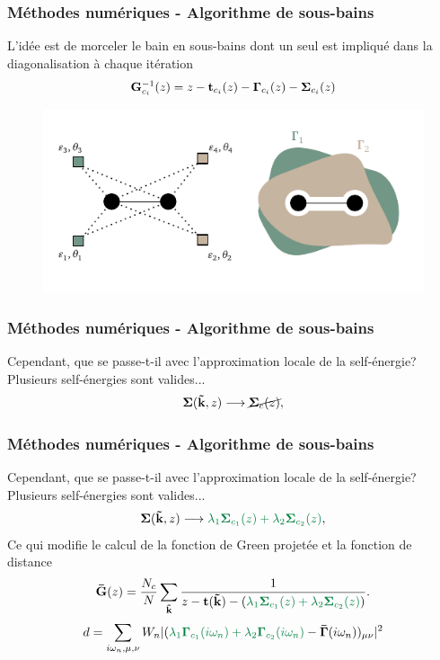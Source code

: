 \begin{frame}
    \frametitle{Méthodes numériques - Algorithme de sous-bains}
    L'idée est de morceler le bain en sous-bains dont un seul est impliqué dans
    la diagonalisation à chaque itération
    \begin{align}
      \vb{G}^{-1}_{c_i}(z) = z - \vb{t}_{c_i}(z) - \vb{\Gamma}_{c_i}(z) - \vb{\Sigma}_{c_i}(z)
    \end{align}
    \begin{figure}
         \centering
         \includegraphics[scale=0.75]{./figures/theory/1D_2s_4vb_bulks.pdf}
         \label{fig: amas_CDMFT_virtual}
    \end{figure}
\end{frame}

\begin{frame}
    \frametitle{Méthodes numériques - Algorithme de sous-bains}
    Cependant, que se passe-t-il avec l'approximation locale de la self-énergie?
    Plusieurs self-énergies sont valides...
    \begin{align}
      {\vb{\Sigma}(\vb{\tilde{k}}, z)\longrightarrow\cancel{\vb{\Sigma}_c(z)},}
    \end{align}
\end{frame}

\begin{frame}
    \frametitle{Méthodes numériques - Algorithme de sous-bains}
    Cependant, que se passe-t-il avec l'approximation locale de la self-énergie?
    Plusieurs self-énergies sont valides...
    \begin{align}
      \vb{\Sigma}(\vb{\tilde{k}}, z)\longrightarrow\textcolor{hard_green}{\lambda_1\vb{\Sigma}_{c_1}(z) +
      \lambda_2\vb{\Sigma}_{c_2}(z)},
    \end{align}
    \pause
    Ce qui modifie le calcul de la fonction de Green projetée et la fonction de distance
    \begin{align}
        \vb{\Bar{G}}(z) = \frac{N_c}{N}\sum_{\vb{\tilde{k}}}\frac{1}{z - \vb{t}(\vb{\tilde{k}}) - (\textcolor{hard_green}{\lambda_1\vb{\Sigma}_{c_1}(z) +
        \lambda_2\vb{\Sigma}_{c_2}(z)})}.
    \end{align}
    \begin{align}
      d = \sum_{i\omega_n, \mu,\nu}W_n|(\textcolor{hard_green}{\lambda_1\vb{\Gamma}_{c_1}(i\omega_n) + \lambda_2\vb{\Gamma}_{c_2}(i\omega_n)} - \vb{\Bar{\Gamma}}(i\omega_n))_{\mu\nu}|^2
    \end{align}
\end{frame}

